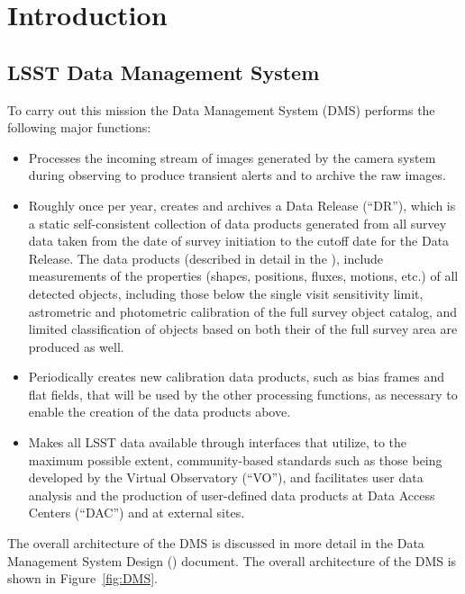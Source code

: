 \section{Introduction}

\subsection{LSST Data Management System}

To carry out this mission the Data Management System (DMS) performs the following major functions:

\begin{itemize}
\item Processes the incoming stream of images generated by the camera
  system during observing to produce transient alerts and to archive
  the raw images.

\item Roughly once per year, creates and archives a Data Release (``DR''),
  which is a static self-consistent collection of data products
  generated from all survey data taken from the date of survey
  initiation to the cutoff date for the Data Release. The data
  products (described in detail in the \DPDD), include measurements of 
  the properties (shapes, positions, fluxes, motions, etc.) of all detected
  objects, including those below the single visit sensitivity limit,
  astrometric and photometric calibration of the full survey object
  catalog, and limited classification of objects based on both their
  of the full survey area are produced as well.

\item Periodically creates new calibration data products, such as bias
  frames and flat fields, that will be used by the other processing
  functions, as necessary to enable the creation of the data products above.

\item Makes all LSST data available through interfaces that utilize,
  to the maximum possible extent, community-based standards such as those
  being developed by the Virtual Observatory (``VO''), and facilitates user
  data analysis and the production of user-defined data products at Data
  Access Centers (``DAC'') and at external sites.
\end{itemize}

The overall architecture of the DMS is discussed in more detail in the Data Management System Design (\DMSD) document. The overall architecture of the DMS is shown in Figure~\ref{fig:DMS}.
\\

